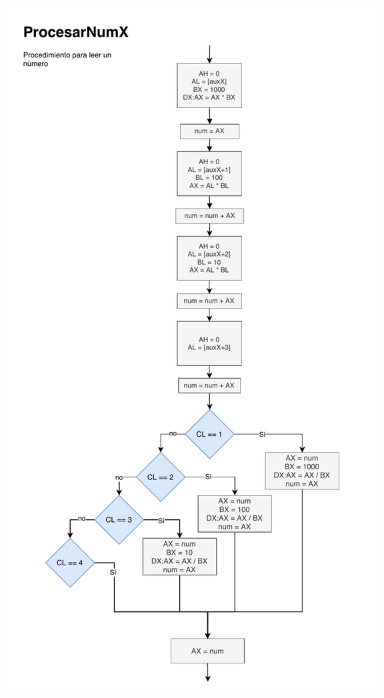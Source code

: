 \documentclass[letterpaper,12 pt,titlepage]{article}
\begin{document}
\begin{center}
        \includegraphics[width=0.73\textwidth]{img/diagramas/p01-ProcNum.pdf}


\end{center}
\end{document}
